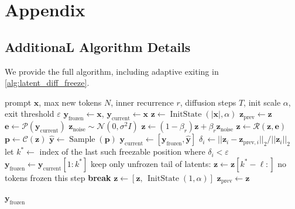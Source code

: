 \documentclass{article} %
\theoremstyle{definition}
\theoremstyle{plain}
\DeclareMathOperator{\Sample}{Sample}
\DeclareMathOperator{\InitState}{InitState}
\begin{document}
\section{Appendix}

\subsection{AdditionaL Algorithm Details}
We provide the full algorithm, including adaptive exiting in \cref{alg:latent_diff_freeze}.
\begin{algorithm}[h]
\caption{Diffusion-style generation with latent-diference-based freezing}
\label{alg:latent_diff_freeze}
\begin{algorithmic}[1]
\Require prompt $\mathbf{x}$, max new tokens $N$, inner recurrence $r$, diffusion steps $T$, init scale $\alpha$, exit threshold $\varepsilon$
\State \(\mathbf{y}_{\mathrm{frozen}}\leftarrow \mathbf{x}\), \(\mathbf{y}_{\mathrm{current}}\leftarrow \mathbf{x}\)
\State \(\mathbf{z}\leftarrow \InitState(|\mathbf{x}|,\alpha)\)
\State \(\mathbf{z}_{\mathrm{prev}}\leftarrow \mathbf{z}\) 
    \State \(\mathbf{e}\leftarrow \mathcal{P}(\mathbf{y}_{\mathrm{current}})\)
    \State \(\mathbf{z}_{\text{noise}}\sim\mathcal{N}(0,\sigma^2 I)\)
    \State \(\mathbf{z}\leftarrow (1-\beta_r)\mathbf{z}+\beta_r\mathbf{z}_{\text{noise}}\)
        \State \(\mathbf{z}\leftarrow \mathcal{R}(\mathbf{z},\mathbf{e})\)
    \EndFor
    \State \(\mathbf{p}\leftarrow \mathcal{C}(\mathbf{z})\)
    \State \(\hat{\mathbf{y}}\leftarrow \Sample(\mathbf{p})\)
    \State $\mathbf{y}_{\mathrm{current}}\leftarrow [\mathbf{y}_{\mathrm{frozen}},\hat{\mathbf{y}}]$
    \State \(\delta_i \leftarrow ||\mathbf{z}_i-\mathbf{z}_{\mathrm{prev},i}||_2 / ||{\mathbf{z}_{i}||_2}\)
        \State let $k^* \leftarrow$ index of the last such freezable position where $\delta_i < \varepsilon$ 
        \State \(\mathbf{y}_{\mathrm{frozen}}\leftarrow \mathbf{y}_{\mathrm{current}}[1{:}k^*]\)
        \State keep only unfrozen tail of latents: \(\mathbf{z}\leftarrow \mathbf{z}[k^* - \ell{:}]\)
    \Else
        \State no tokens frozen this step
    \EndIf
     \textbf{break} \EndIf
    \State \(\mathbf{z}\leftarrow [\mathbf{z},\,\InitState(1,\alpha)]\) 
    \State \(\mathbf{z}_{\mathrm{prev}}\leftarrow \mathbf{z}\)

\EndFor
\State \Return \(\mathbf{y}_{\mathrm{frozen}}\)
\end{algorithmic}
\end{algorithm}
\end{document}
